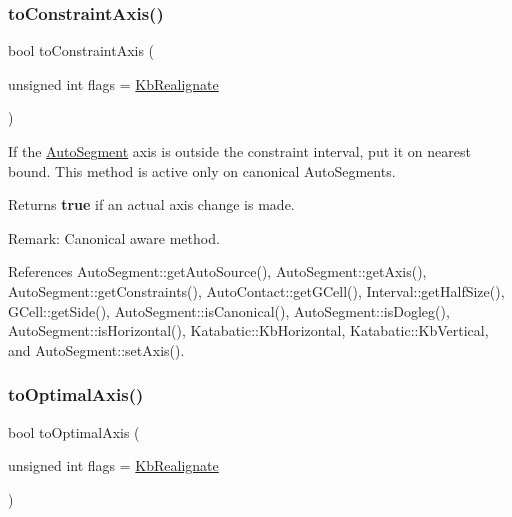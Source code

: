 \subsubsection{\texorpdfstring{to\+Constraint\+Axis()}{toConstraintAxis()}}
{\footnotesize\ttfamily bool to\+Constraint\+Axis (\begin{DoxyParamCaption}\item[{unsigned int}]{flags = {\ttfamily \mbox{\hyperlink{namespaceKatabatic_a2af2ad6b6441614038caf59d04b3b217a45a219697151531a23e997b11118e08a}{Kb\+Realignate}}} }\end{DoxyParamCaption})}

If the \mbox{\hyperlink{classKatabatic_1_1AutoSegment}{Auto\+Segment}} axis is outside the constraint interval, put it on nearest bound. This method is active only on canonical Auto\+Segments.

\begin{DoxyReturn}{Returns}
{\bfseries true} if an actual axis change is made.
\end{DoxyReturn}
\begin{DoxyParagraph}{Remark\+: Canonical aware method. }

\end{DoxyParagraph}


References Auto\+Segment\+::get\+Auto\+Source(), Auto\+Segment\+::get\+Axis(), Auto\+Segment\+::get\+Constraints(), Auto\+Contact\+::get\+G\+Cell(), Interval\+::get\+Half\+Size(), G\+Cell\+::get\+Side(), Auto\+Segment\+::is\+Canonical(), Auto\+Segment\+::is\+Dogleg(), Auto\+Segment\+::is\+Horizontal(), Katabatic\+::\+Kb\+Horizontal, Katabatic\+::\+Kb\+Vertical, and Auto\+Segment\+::set\+Axis().

\mbox{\label{classKatabatic_1_1AutoSegment_a750983d7154c94b54537127a3a18e14b}} 
\subsubsection{\texorpdfstring{to\+Optimal\+Axis()}{toOptimalAxis()}}
{\footnotesize\ttfamily bool to\+Optimal\+Axis (\begin{DoxyParamCaption}\item[{unsigned int}]{flags = {\ttfamily \mbox{\hyperlink{namespaceKatabatic_a2af2ad6b6441614038caf59d04b3b217a45a219697151531a23e997b11118e08a}{Kb\+Realignate}}} }\end{DoxyParamCaption})}

